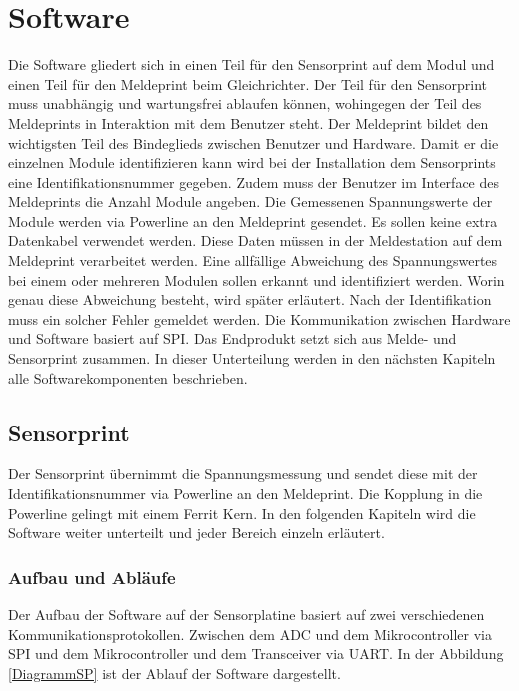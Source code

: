 \section{Software}
Die Software gliedert sich in einen Teil für den Sensorprint auf dem Modul und einen Teil für den Meldeprint beim Gleichrichter. Der Teil für den Sensorprint muss unabhängig und wartungsfrei ablaufen können, wohingegen der Teil des Meldeprints in Interaktion mit dem Benutzer steht. Der Meldeprint bildet den wichtigsten Teil des Bindeglieds zwischen Benutzer und Hardware. Damit er die einzelnen Module identifizieren kann wird bei der Installation dem Sensorprints eine Identifikationsnummer gegeben. Zudem muss der Benutzer im Interface des Meldeprints die Anzahl Module angeben.
Die Gemessenen Spannungswerte der Module werden via Powerline an den Meldeprint gesendet. Es sollen keine extra Datenkabel verwendet werden. Diese Daten müssen in der Meldestation auf dem Meldeprint verarbeitet werden. Eine allfällige Abweichung des Spannungswertes bei einem oder mehreren Modulen sollen erkannt und identifiziert werden. Worin genau diese Abweichung besteht, wird später erläutert. Nach der Identifikation muss ein solcher Fehler gemeldet werden. Die Kommunikation zwischen Hardware und Software basiert auf SPI. Das Endprodukt setzt sich aus Melde- und Sensorprint zusammen. In dieser Unterteilung werden in den nächsten Kapiteln alle Softwarekomponenten beschrieben.
\newpage
\subsection{Sensorprint}\label{Software_sensorprint}
Der Sensorprint übernimmt die Spannungsmessung und sendet diese mit der Identifikationsnummer via Powerline an den Meldeprint. Die Kopplung in die Powerline gelingt mit einem Ferrit Kern. In den folgenden Kapiteln wird die Software weiter unterteilt und jeder Bereich einzeln erläutert.
\subsubsection{Aufbau und Abläufe}
Der Aufbau der Software auf der Sensorplatine basiert auf zwei verschiedenen Kommunikationsprotokollen. Zwischen dem ADC und dem Mikrocontroller via SPI und dem Mikrocontroller und dem Transceiver via UART. In der Abbildung \ref{DiagrammSP} ist der Ablauf der Software dargestellt.

